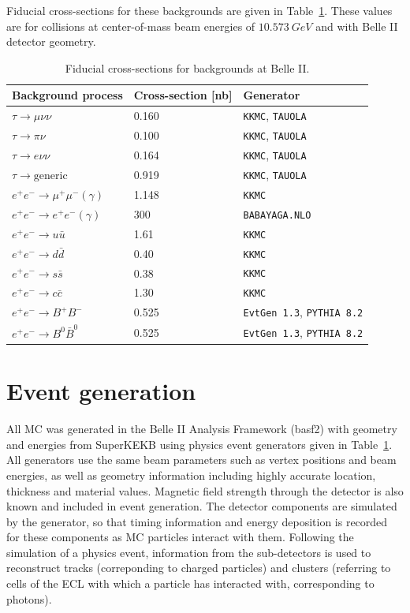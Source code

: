 \documentclass[12pt]{thesis}  %
\begin{document}
Fiducial cross-sections for these backgrounds are given in Table~\ref{tab:background cross-sections}. These values are for collisions at center-of-mass beam energies of $\SI{10.573}{GeV}$ and with Belle II detector geometry.


\begin{table}[h]
\centering
\begin{tabular}{lll}
\hline 
\textbf{Background process} & \textbf{Cross-section [nb]} & \textbf{Generator} \\
\hline
$\tau \to \mu\nu\nu$ & \num{0.160} & \texttt{KKMC}, \texttt{TAUOLA} \\
$\tau \to \pi\nu$ & \num{0.100} & \texttt{KKMC}, \texttt{TAUOLA} \\
$\tau \to e\nu\nu$ & \num{0.164} & \texttt{KKMC}, \texttt{TAUOLA}  \\
$\tau \to \text{generic}$ & \num{0.919} & \texttt{KKMC}, \texttt{TAUOLA} \\
$e^+e^- \to \mu^+\mu^-(\gamma)$ & \num{1.148} & \texttt{KKMC} \\
$e^+e^- \to e^+e^-(\gamma)$ & \num{300} & \texttt{BABAYAGA.NLO}   \\ \hline
$e^+e^- \to u\bar{u}$ & \num{1.61} & \texttt{KKMC} \\
$e^+e^- \to d\bar{d}$ & \num{0.40} & \texttt{KKMC} \\
$e^+e^- \to s\bar{s}$ & \num{0.38} & \texttt{KKMC} \\
$e^+e^- \to c\bar{c}$ & \num{1.30} & \texttt{KKMC} \\
$e^+e^- \to B^+B^-$ & \num{0.525} & \texttt{EvtGen 1.3}, \texttt{PYTHIA 8.2} \\
$e^+e^- \to B^0\bar{B}^0$ & \num{0.525} & \texttt{EvtGen 1.3}, \texttt{PYTHIA 8.2} \\ \hline
\end{tabular}
\caption[]%
{{\small Fiducial cross-sections for backgrounds at Belle II.}}
\label{tab:background cross-sections}
\end{table}


\section{Event generation}

All MC was generated in the Belle II Analysis Framework (basf2) with geometry and energies from SuperKEKB using physics event generators given in Table~\ref{tab:background cross-sections}. All generators use the same beam parameters such as vertex positions and beam energies, as well as geometry information including highly accurate location, thickness and material values. Magnetic field strength through the detector is also known and included in event generation. The detector components are simulated by the generator, so that timing information and energy deposition is recorded for these components as MC particles interact with them. Following the simulation of a physics event, information from the sub-detectors is used to reconstruct tracks (correponding to charged particles) and clusters (referring to cells of the ECL with which a particle has interacted with, corresponding to photons).
\end{document}
